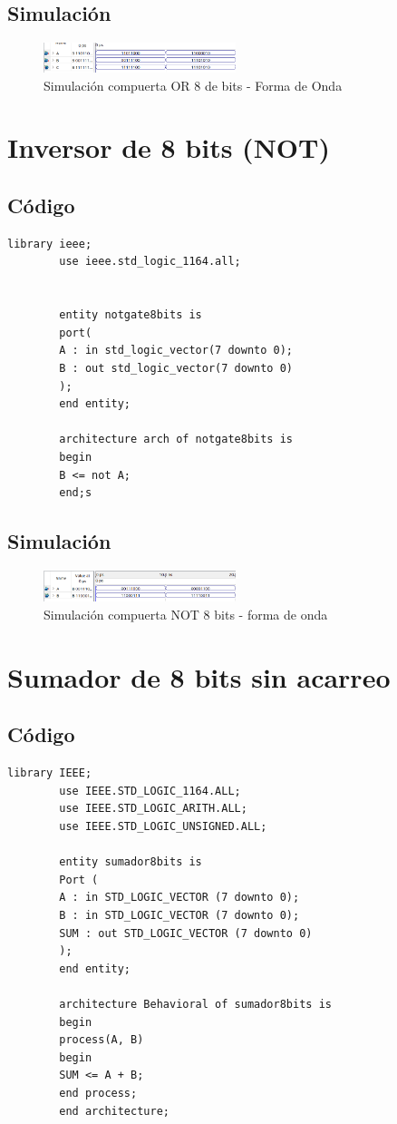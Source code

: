 \documentclass[conference]{IEEEtran}
\begin{document}
	\subsection{Simulación}
	\begin{figure}[h]
		\centering
		\includegraphics[width=0.5\textwidth]{media/orgate8bits}
		\caption{Simulación compuerta OR 8 de bits - Forma de Onda}
		\label{fig:orgate8bits1}
	\end{figure}
	
	\section{Inversor de 8 bits (NOT)}
	\subsection{Código}
	\begin{lstlisting}[numbers=none]
		 library ieee;
		use ieee.std_logic_1164.all;
		
		
		entity notgate8bits is
		port(
		A : in std_logic_vector(7 downto 0);
		B : out std_logic_vector(7 downto 0)
		);
		end entity;
		
		architecture arch of notgate8bits is
		begin
		B <= not A;
		end;s
	\end{lstlisting}
	\subsection{Simulación}
	\begin{figure}[h]
		\centering
		\includegraphics[width=0.5\textwidth]{media/notgate8bits1}
		\caption{Simulación compuerta NOT 8 bits - forma de onda}
		\label{fig:notgate8bits1}
	\end{figure}
	
	
	\section{Sumador de 8 bits sin acarreo}
	\subsection{Código}
	\begin{lstlisting}[numbers=none]
		library IEEE;
		use IEEE.STD_LOGIC_1164.ALL;
		use IEEE.STD_LOGIC_ARITH.ALL;
		use IEEE.STD_LOGIC_UNSIGNED.ALL;
		
		entity sumador8bits is
		Port (
		A : in STD_LOGIC_VECTOR (7 downto 0);
		B : in STD_LOGIC_VECTOR (7 downto 0);
		SUM : out STD_LOGIC_VECTOR (7 downto 0)
		);
		end entity;
		
		architecture Behavioral of sumador8bits is
		begin
		process(A, B)
		begin
		SUM <= A + B;
		end process;
		end architecture;
		
	\end{lstlisting}
\end{document}
